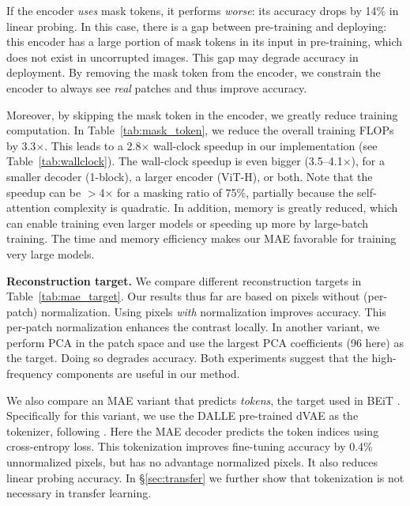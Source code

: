 \documentclass[10pt,twocolumn,letterpaper]{article}
\renewcommand{\paragraph}[1]{\vspace{1.25mm}\noindent\textbf{#1}}
\begin{document}
If the encoder \textit{uses} mask tokens, it performs \textit{worse}: its accuracy drops by 14\% in linear probing. In this case, there is a gap between pre-training and deploying: this encoder has a large portion of mask tokens in its input in pre-training, which does not exist in uncorrupted images. This gap may degrade accuracy in deployment. By removing the mask token from the encoder, we constrain the encoder to always see \textit{real} patches and thus improve accuracy.

Moreover, by skipping the mask token in the encoder, we greatly reduce training computation. In Table~\ref{tab:mask_token}, we reduce the overall training FLOPs by 3.3$\times$. This leads to a 2.8$\times$ wall-clock speedup in our implementation (see Table~\ref{tab:wallclock}). The wall-clock speedup is even bigger (3.5--4.1$\times$), for a smaller decoder (1-block), a larger encoder (\mbox{ViT-H}), or both. Note that the speedup can be $>$4$\times$ for a masking ratio of 75\%, partially because the self-attention complexity is quadratic. In addition, memory is greatly reduced, which can enable training even larger models or speeding up more by large-batch training. The time and memory efficiency makes our MAE favorable for training very large models.

\paragraph{Reconstruction target.} We compare different reconstruction targets in Table~\ref{tab:mae_target}. Our results thus far are based on pixels without (per-patch) normalization. Using pixels \textit{with} normalization improves accuracy. This per-patch normalization enhances the contrast locally. In another variant, we perform PCA in the patch space and use the largest PCA coefficients (96 here) as the target. Doing so degrades accuracy. Both experiments suggest that the high-frequency components are useful in our method.

We also compare an MAE variant that predicts \textit{tokens}, the target used in BEiT \cite{Bao2021}. Specifically for this variant, we use the DALLE pre-trained dVAE \cite{Ramesh2021} as the tokenizer, following \cite{Bao2021}. Here the MAE decoder predicts the token indices using cross-entropy loss. This tokenization improves fine-tuning accuracy by 0.4\% \vs unnormalized pixels, but has no advantage \vs normalized pixels. It also reduces linear probing accuracy. In \mbox{\S\ref{sec:transfer}} we further show that tokenization is not necessary in transfer learning.
\end{document}
